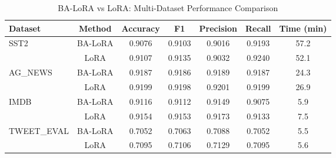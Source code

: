\begin{table}[ht]
\centering
\caption{BA-LoRA vs LoRA: Multi-Dataset Performance Comparison}
\label{tab:multi_dataset_results}
\begin{tabular}{lcccccc}
\toprule
\textbf{Dataset} & \textbf{Method} & \textbf{Accuracy} & \textbf{F1} & \textbf{Precision} & \textbf{Recall} & \textbf{Time (min)} \\
\midrule
\multirow{2}{*}{SST2}
 & BA-LoRA & 0.9076 & 0.9103 & 0.9016 & 0.9193 & 57.2 \\
 & LoRA & 0.9107 & 0.9135 & 0.9032 & 0.9240 & 52.1 \\
\midrule
\multirow{2}{*}{AG_NEWS}
 & BA-LoRA & 0.9187 & 0.9186 & 0.9189 & 0.9187 & 24.3 \\
 & LoRA & 0.9199 & 0.9198 & 0.9201 & 0.9199 & 26.9 \\
\midrule
\multirow{2}{*}{IMDB}
 & BA-LoRA & 0.9116 & 0.9112 & 0.9149 & 0.9075 & 5.9 \\
 & LoRA & 0.9154 & 0.9153 & 0.9173 & 0.9133 & 7.5 \\
\midrule
\multirow{2}{*}{TWEET_EVAL}
 & BA-LoRA & 0.7052 & 0.7063 & 0.7088 & 0.7052 & 5.5 \\
 & LoRA & 0.7095 & 0.7106 & 0.7129 & 0.7095 & 5.6 \\
\midrule
\bottomrule
\end{tabular}
\end{table}
